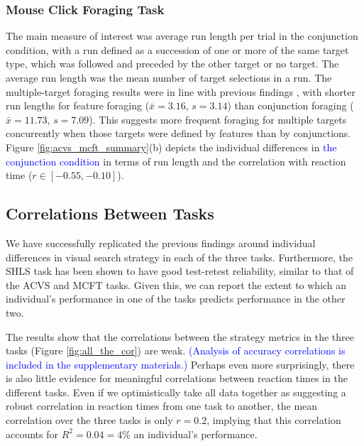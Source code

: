 \documentclass[Afour, sageapa, times]{sagej}
\begin{document}
\subsubsection{Mouse Click Foraging Task}
 
The main measure of interest was average run length per trial in the conjunction condition, with a run defined as a succession of one or more of the same target type, which was followed and preceded by the other target or no target. The average run length was the mean number of target selections in a run. The multiple-target foraging results were in line with previous findings  \cite{kristjansson2014,johannesson2016}, with shorter run lengths for feature foraging ($\bar{x} = 3.16$, $s = 3.14$) than conjunction foraging ($\bar{x} = 11.73$, $s = 7.09$). This suggests more frequent foraging for multiple targets concurrently when those targets were defined by features than by conjunctions. Figure \ref{fig:acvs_mcft_summary}(b) depicts the individual differences in \textcolor{blue}{the conjunction condition} in terms of run length and the correlation with reaction time ($r \in [-0.55, -0.10]$).

\subsection{Correlations Between Tasks}

We have successfully replicated the previous findings around individual differences in visual search strategy in each of the three tasks. Furthermore, the SHLS task has been shown to have good test-retest reliability, similar to that of the ACVS  and MCFT tasks. Given this, we can report the extent to which an individual's performance in one of the tasks predicts performance in the other two. 

The results show that the correlations between the strategy metrics in the three tasks (Figure \ref{fig:all_the_cor}) are weak. \textcolor{blue}{(Analysis of accuracy correlations is included in the supplementary materials.)} Perhaps even more surprisingly, there is also little evidence for meaningful correlations between reaction times in the different tasks. Even if we optimistically take all data together as suggesting a robust correlation in reaction times from one task to another, the mean correlation over the three tasks is only $r = 0.2$, implying that this correlation accounts for  $R^2 = 0.04 = 4\%$ an individual's performance. 
\end{document}
